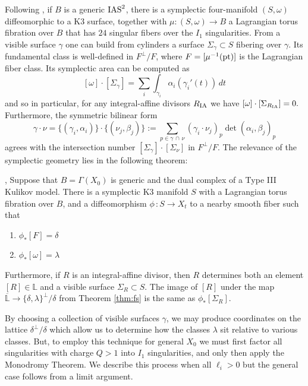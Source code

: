 \documentclass[table,x11names]{amsart}
\begin{document}
Following \cite{symington2003four-dimensions}, if $B$ is a generic $\operatorname{IAS}^2$, there is a symplectic
four-manifold $(S,\omega)$ diffeomorphic to a K3 surface, together with
$\mu\colon (S,\omega)\rightarrow B$
a Lagrangian torus fibration over $B$ that has $24$ singular fibers
over the $I_1$ singularities. From a visible surface
$\gamma$ one can build from cylinders a surface $\Sigma_\gamma\subset S$ 
fibering over $\gamma$. Its fundamental class is well-defined in $F^\perp/F$,
where $F=[\mu^{-1}({\rm pt})]$ is the Lagrangian fiber class. Its symplectic area can be computed as
$$[\omega]\cdot [\Sigma_\gamma]=\sum_i \int_{\gamma_i} \alpha_i(\gamma_i'(t))\,dt$$
and so in particular, for any integral-affine divisors $R_{{\rm IA}}$ we have $[\omega] \cdot [\Sigma_{R_{{\rm IA}}}]=0.$
 Furthermore, the symmetric bilinear form
 $$\gamma\cdot \nu=\{(\gamma_i,\alpha_i)\}\cdot \{(\nu_j,\beta_j)\}
 := \sum_{p\in \gamma\,\cap\, \nu } (\gamma_i\cdot \nu_j)_p \det(\alpha_i,\beta_j)_p$$
 agrees with the intersection number $[\Sigma_\gamma]\cdot [\Sigma_\nu]$ in $F^\perp/F$.
 The relevance of the symplectic geometry
lies in the following theorem:

 \begin{theorem}\cite[Prop.3.14]{engel2021smoothings}, 
\cite[Thm.8.38]{alexeev2019stable-pair}
\label{thm:mono}  Suppose that $B=\Gamma(X_0)$ is
 generic and the dual complex of a Type III Kulikov model. There is a symplectic K3
 manifold $S$ with a Lagrangian torus fibration over $B$, and
 a diffeomorphism $\phi\,:S\rightarrow X_t$ to a nearby smooth fiber such that
 \begin{enumerate}
 \item $\phi_*[F] = \delta$
 \item $\phi_*[\omega] = \lambda$
 \end{enumerate}
Furthermore, if $R$ is an integral-affine divisor, then $R$ determines both
an element $[R]\in \mathbb{L}$ and a visible surface $\Sigma_R\subset S$. The image of
$[R]$ under the map $\overline{\mathbb{L}}\rightarrow \{\delta,\lambda\}^\perp/\delta$
from Theorem \ref{thm:fs}
is the same as $\phi_*[\Sigma_R]$.
 \end{theorem}
  
 By choosing a collection of visible surfaces $\gamma$, we may produce
 coordinates on the lattice $\delta^\perp/\delta$ which allow us to determine
 how the classes $\lambda$ sit relative to various classes. But, to employ
 this technique for general $X_0$
 we must first factor all singularities with charge $Q>1$ into $I_1$
 singularities, and only then apply the Monodromy Theorem.
 We describe this process when all $\ell_i>0$ but the general case
 follows from a limit argument.
 
\end{document}
